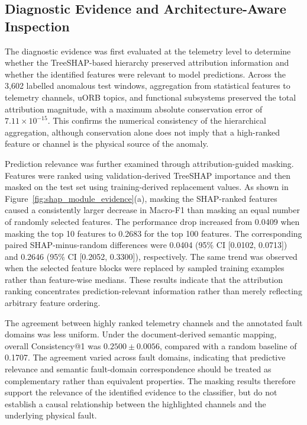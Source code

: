 \subsection{Diagnostic Evidence and Architecture-Aware Inspection}
\label{sec:shap_module_results}

The diagnostic evidence was first evaluated at the telemetry level to determine whether the TreeSHAP-based hierarchy preserved attribution information and whether the identified features were relevant to model predictions. Across the 3,602 labelled anomalous test windows, aggregation from statistical features to telemetry channels, uORB topics, and functional subsystems preserved the total attribution magnitude, with a maximum absolute conservation error of $7.11\times10^{-15}$. This confirms the numerical consistency of the hierarchical aggregation, although conservation alone does not imply that a high-ranked feature or channel is the physical source of the anomaly.

Prediction relevance was further examined through attribution-guided masking. Features were ranked using validation-derived TreeSHAP importance and then masked on the test set using training-derived replacement values. As shown in Figure~\ref{fig:shap_module_evidence}(a), masking the SHAP-ranked features caused a consistently larger decrease in Macro-F1 than masking an equal number of randomly selected features. The performance drop increased from 0.0409 when masking the top 10 features to 0.2683 for the top 100 features. The corresponding paired SHAP-minus-random differences were 0.0404 (95\% CI [0.0102, 0.0713]) and 0.2646 (95\% CI [0.2052, 0.3300]), respectively. The same trend was observed when the selected feature blocks were replaced by sampled training examples rather than feature-wise medians. These results indicate that the attribution ranking concentrates prediction-relevant information rather than merely reflecting arbitrary feature ordering.

The agreement between highly ranked telemetry channels and the annotated fault domains was less uniform. Under the document-derived semantic mapping, overall Consistency@1 was $0.2500\pm0.0056$, compared with a random baseline of 0.1707. The agreement varied across fault domains, indicating that predictive relevance and semantic fault-domain correspondence should be treated as complementary rather than equivalent properties. The masking results therefore support the relevance of the identified evidence to the classifier, but do not establish a causal relationship between the highlighted channels and the underlying physical fault.

